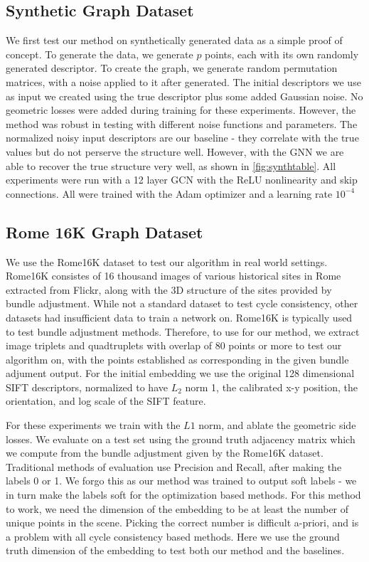 \documentclass[10pt,twocolumn,letterpaper]{article}
\begin{document}
\subsection{Synthetic Graph Dataset}
We first test our method on synthetically generated data as a simple proof of concept.
To generate the data, we generate $p$ points, each with its own randomly generated descriptor.
To create the graph, we generate random permutation matrices, with a noise applied to it after generated.
The initial descriptors we use as input we created using the true descriptor plus some added Gaussian noise.
No geometric losses were added during training for these experiments.
However, the method was robust in testing with different noise functions and parameters.
The normalized noisy input descriptors are our baseline - they correlate with the true values but do not perserve the structure well.
However, with the GNN we are able to recover the true structure very well, as shown in \ref{fig:synthtable}.
All experiments were run with a 12 layer GCN with the ReLU nonlinearity and skip connections.
All were trained with the Adam optimizer \cite{kingma2014adam} and a learning rate $10^{-4}$


\subsection{Rome 16K Graph Dataset}
We  use the Rome16K dataset \cite{li2010location} to test our algorithm in real world settings.
Rome16K consistes of 16 thousand images of various historical sites in Rome extracted from Flickr, along with the 3D structure of the sites provided by bundle adjustment.
While not a standard dataset to test cycle consistency, other datasets had insufficient data to train a network on.
Rome16K is typically used to test bundle adjustment methods.
Therefore, to use for our method, we extract image triplets and quadtruplets with overlap of 80 points or more to test our algorithm on, with the points established as corresponding in the given bundle adjument output.
For the initial embedding we use the original 128 dimensional SIFT descriptors, normalized to have $L_2$ norm 1, the calibrated x-y position, the orientation, and log scale of the SIFT feature.

For these experiments we train with the $L1$ norm, and ablate the geometric side losses.
We evaluate on a test set using the ground truth adjacency matrix which we compute from the bundle adjustment given by the Rome16K dataset.
Traditional methods of evaluation use Precision and Recall, after making the labels 0 or 1.
We forgo this as our method was trained to output soft labels - we in turn make the labels soft for the optimization based methods.
For this method to work, we need the dimension of the embedding to be at least the number of unique points in the scene.
Picking the correct number is difficult a-priori, and is a problem with all cycle consistency based methods.
Here we use the ground truth dimension of the embedding to test both our method and the baselines.
\end{document}
